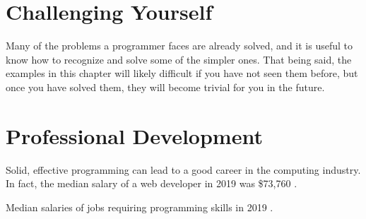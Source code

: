 \documentclass[12pt, oneside, a4paper]{book}
\begin{document}
   \chapter{Challenging Yourself}
   \label{chap:challenge}
      Many of the problems a programmer faces are already solved, and it is useful to know how to recognize and solve some of the simpler ones.
      That being said, the examples in this chapter will likely difficult if you have not seen them before, but once you have solved them, they will become trivial for you in the future.

   \chapter{Professional Development}
      Solid, effective programming can lead to a good career in the computing industry.
      In fact, the median salary of a web developer in 2019 was \$73,760 \autocite{malvikProgrammingCareersCoding}.
      
   \begin{table}
      \caption{
         Median salaries of jobs requiring programming skills in 2019 \autocite{malvikProgrammingCareersCoding}.
      }
   \end{table}
   \label{chap:prof_devel}

\newpage
{}
\printbibliography[heading=bibintoc]
\end{document}
